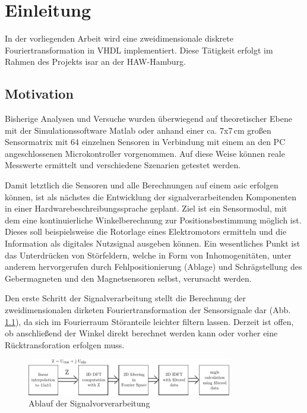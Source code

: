 \chapter{Einleitung}
In der vorliegenden Arbeit wird eine zweidimensionale diskrete Fouriertransformation in VHDL implementiert. Diese Tätigkeit erfolgt im Rahmen des Projekts \gls{isar} an der 
HAW-Hamburg.
 \section{Motivation}
 Bisherige Analysen und Versuche wurden überwiegend auf theoretischer Ebene mit der Simulationssoftware Matlab oder anhand einer ca. 7x7\,cm großen Sensormatrix mit 64 einzelnen Sensoren in Verbindung mit
 einem an den PC angeschlossenen Microkontroller vorgenommen. Auf diese Weise können reale Messwerte ermittelt und verschiedene Szenarien getestet werden.
 
 Damit letztlich die Sensoren und alle Berechnungen auf einem \gls{asic} erfolgen können, ist als nächstes die Entwicklung der signalverarbeitenden Komponenten in einer Hardwarebeschreibungssprache geplant.
 Ziel ist ein Sensormodul, mit dem eine kontinuierliche Winkelberechnung zur Positionsbestimmung möglich ist. Dieses soll beispielsweise die Rotorlage eines Elektromotors ermitteln und die Information als digitales Nutzsignal ausgeben können. Ein wesentliches Punkt ist das Unterdrücken von Störfeldern, welche in Form von Inhomogenitäten, unter anderem hervorgerufen durch Fehlpositionierung (Ablage) und Schrägstellung des Gebermagneten und den Magnetsensoren selbst, verursacht werden. 

 Den erste Schritt der Signalverarbeitung stellt die Berechnung der zweidimensionalen dirketen Fouriertransformation der Sensorsignale dar (Abb. \ref{pic:AblaufFourier}), da sich im Fourierraum Störanteile leichter filtern lassen. Derzeit ist offen, ob anschließend der Winkel direkt berechnet werden kann oder vorher eine Rücktransforation erfolgen muss.
 

\begin{figure}[ht!]
 \centering
 \includegraphics[width=0.8\textwidth]{img/AblaufFourier.pdf}
 \caption{Ablauf der Signalvorverarbeitung~\autocite[9]{krrts2017freqfilt}}
 \label{pic:AblaufFourier}
\end{figure}


